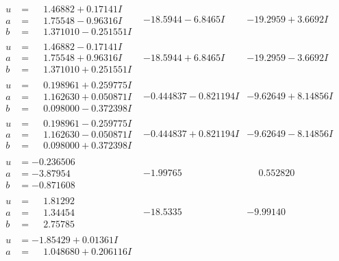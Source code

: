 \documentclass[1p]{elsarticle_modified}
\theoremstyle{definition}
\begin{document}
$$\begin{array}{c|c|c}
\begin{aligned}
u &= \phantom{-}1.46882 + 0.17141 I \\
a &= \phantom{-}1.75548 - 0.96316 I \\
b &= \phantom{-}1.371010 - 0.251551 I\end{aligned}
 & -18.5944 - 6.8465 I & -19.2959 + 3.6692 I \\ \hline\begin{aligned}
u &= \phantom{-}1.46882 - 0.17141 I \\
a &= \phantom{-}1.75548 + 0.96316 I \\
b &= \phantom{-}1.371010 + 0.251551 I\end{aligned}
 & -18.5944 + 6.8465 I & -19.2959 - 3.6692 I \\ \hline\begin{aligned}
u &= \phantom{-}0.198961 + 0.259775 I \\
a &= \phantom{-}1.162630 + 0.050871 I \\
b &= \phantom{-}0.098000 - 0.372398 I\end{aligned}
 & -0.444837 - 0.821194 I & -9.62649 + 8.14856 I \\ \hline\begin{aligned}
u &= \phantom{-}0.198961 - 0.259775 I \\
a &= \phantom{-}1.162630 - 0.050871 I \\
b &= \phantom{-}0.098000 + 0.372398 I\end{aligned}
 & -0.444837 + 0.821194 I & -9.62649 - 8.14856 I \\ \hline\begin{aligned}
u &= -0.236506\phantom{ +0.000000I} \\
a &= -3.87954\phantom{ +0.000000I} \\
b &= -0.871608\phantom{ +0.000000I}\end{aligned}
 & -1.99765\phantom{ +0.000000I} & \phantom{-}0.552820\phantom{ +0.000000I} \\ \hline\begin{aligned}
u &= \phantom{-}1.81292\phantom{ +0.000000I} \\
a &= \phantom{-}1.34454\phantom{ +0.000000I} \\
b &= \phantom{-}2.75785\phantom{ +0.000000I}\end{aligned}
 & -18.5335\phantom{ +0.000000I} & -9.99140\phantom{ +0.000000I} \\ \hline\begin{aligned}
u &= -1.85429 + 0.01361 I \\
a &= \phantom{-}1.048680 + 0.206116 I \\

\end{aligned}
\end{array}$$
\end{document}
